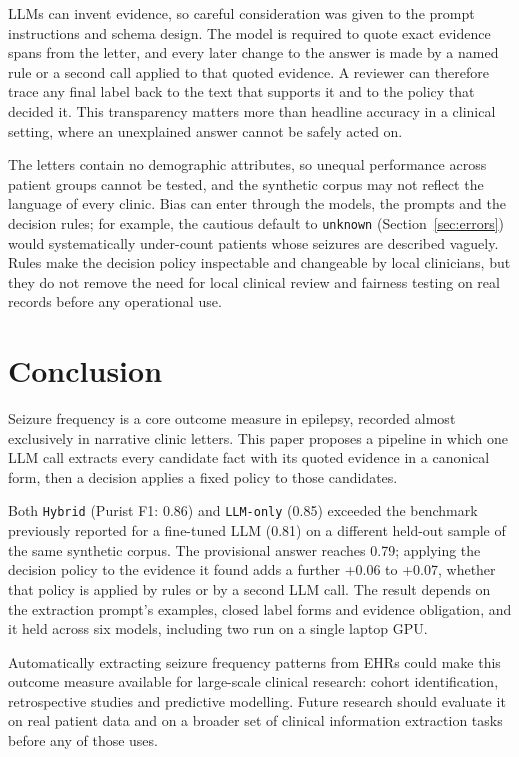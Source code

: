 \documentclass[conference]{IEEEtran}
\begin{document}
LLMs can invent evidence, so careful consideration was given
to the prompt instructions and schema design. The model is
required to quote exact evidence spans from the letter, and 
every later change to the answer is made by a named rule or 
a second call applied to that quoted evidence. A 
reviewer can therefore trace any final label back to the 
text that supports it and to the policy that decided 
it\cite{b14}. This transparency matters more than headline 
accuracy in a clinical setting, where an unexplained answer 
cannot be safely acted on.

The letters contain no demographic attributes, so unequal
performance across patient groups cannot be tested, and the 
synthetic corpus may not reflect the language of every 
clinic. Bias can enter through the models, the prompts and 
the decision rules; for example, the cautious default to 
\texttt{unknown} (Section~\ref{sec:errors}) would 
systematically under-count patients whose seizures are 
described vaguely. Rules make the decision policy 
inspectable and changeable by local clinicians, but they do 
not remove the need for local clinical review and fairness 
testing on real records before any operational use.

\section{Conclusion}

Seizure frequency is a core outcome measure in epilepsy, 
recorded almost exclusively in narrative clinic letters. This 
paper proposes a pipeline in which 
one LLM call extracts every candidate fact with its quoted 
evidence in a canonical form, then a decision applies a 
fixed policy to those candidates. 

Both \texttt{Hybrid} (Purist F1: 0.86) and \texttt{LLM-only} 
(0.85) exceeded the benchmark previously reported for a 
fine-tuned LLM (0.81) on a different held-out sample of the 
same synthetic corpus. The provisional 
answer reaches 0.79; applying the decision policy to the 
evidence it found adds a further +0.06 to +0.07, whether that 
policy is applied by rules or by a second LLM call. 
The result depends on the extraction prompt's examples, closed 
label forms and evidence obligation, and it held across six 
models, including two run on a single laptop GPU.

Automatically extracting seizure frequency patterns from EHRs 
could make this outcome measure available for large-scale 
clinical research: cohort identification, retrospective 
studies and predictive modelling. Future research should evaluate it on real 
patient data and on a broader set of clinical information 
extraction tasks before any of those uses.
\end{document}
